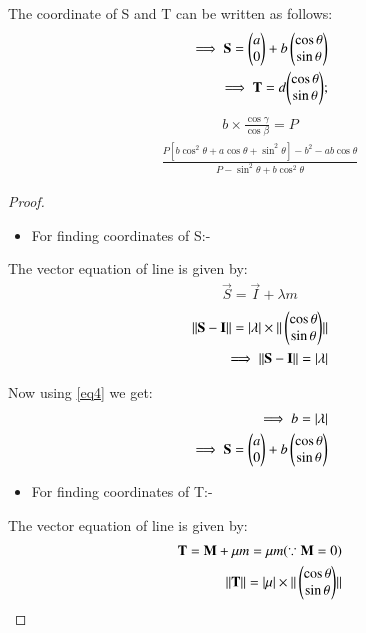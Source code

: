 \documentclass[journal,12pt,twocolumn]{IEEEtran}
\begin{document}
\begin{enumerate}
\begin{lemma}
\label{lemma}
The coordinate of S and T can be written as follows:
\begin{align}
\implies \mathbf{S}=\begin{pmatrix}a\\0\end{pmatrix} + b\begin{pmatrix}\cos\theta \\\sin \theta \end{pmatrix} \label{eq13}
\\
\implies \mathbf{T}= d{\begin{pmatrix}\cos \theta\\\sin \theta \end{pmatrix}};
\end{align}
\begin{align} 
b\times \frac{\cos \gamma}{\cos\beta} =P 
\end{align}
\begin{multline}
\frac{P[b\cos^2\theta+a\cos\theta+\sin^2\theta]-b^2-ab\cos\theta} {P-\sin^2\theta +b\cos^2 \theta}  \label{eqb} 
\end{multline}
\end{lemma}
\begin{proof}
\begin{itemize}
\item For finding coordinates of S:-
\end{itemize}
The vector equation of line is given by:
\begin{align}
\vec{S}=\vec{I} + \lambda m \label{eq8}
\end{align}
\begin{align}
\Vert\mathbf{S}-\mathbf{I}\rVert = \vert\lambda\vert\times\Vert\begin{pmatrix}\cos \theta\\\sin \theta\end{pmatrix}\rVert 
\\
\implies \Vert\mathbf{S}-\mathbf{I}\rVert=\vert\lambda\vert
\end{align}
\item Now using \eqref{eq4} we get:
\begin{align}
\implies b=\vert\lambda\vert \label{eq12}
\\
\implies \mathbf{S}=\begin{pmatrix}a\\0\end{pmatrix} + b\begin{pmatrix}\cos\theta \\\sin \theta \end{pmatrix} 
\end{align}
\begin{itemize}
\item For finding coordinates of T:-
\end{itemize}
The vector equation of line is given by:
\begin{align}
\mathbf{T}=\mathbf{M} + \mu m =\mu m (\because \mathbf{M}=0) 
\\
\Vert\mathbf{T}\rVert=\vert\mu\vert\times\Vert\begin{pmatrix}\cos \theta\\\sin \theta\end{pmatrix}\rVert 
\end{align}

\end{proof}
\end{enumerate}
\end{document}
